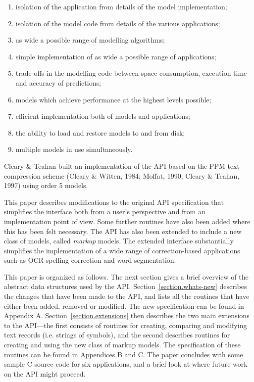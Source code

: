 \documentclass[11pt]{article}
\begin{document}
\begin{enumerate}
\item  isolation of the application from details of the model implementation;

\item  isolation of the model code from details of the various applications;

\item  as wide a possible range of modelling algorithms;

\item  simple implementation of as wide a possible range of applications;

\item  trade-offs in the modelling code between space consumption, execution
time and accuracy of predictions;

\item  models which achieve performance at the highest levels possible;

\item  efficient implementation both of models and applications;

\item  the ability to load and restore models to and from disk;

\item  multiple models in use simultaneously.
\end{enumerate}

Cleary \& Teahan built an implementation of the API based on the PPM text compression
scheme (Cleary \& Witten, 1984; Moffat, 1990; Cleary \& Teahan, 1997) using order 5 models.
 
This paper describes modifications to the original API specification that simplifies
the interface both from
a user's perspective and from an implementation point of view. Some further routines
have also been added where this has been felt necessary.
The API has also been extended to include a new class of models, called
{\em markup} models. The extended interface substantially simplifies the
implementation of a wide range of correction-based applications such as OCR
spelling correction and word segmentation.

This paper is organized as follows.
The next section gives a brief overview of the abstract data structures used by the API. 
Section~\ref{section.whats-new} describes the changes that have been made to the API,
and lists all the routines that have either been added, removed or modified.
The new specification can be found in Appendix A.
Section~\ref{section.extensions} then describes the two main extensions to the API---the first consists of
routines for creating, comparing and modifying text records (i.e. strings of
symbols), and the second describes routines for creating and using the new class
of markup models. The specification of these routines can be found
in Appendices B and C. The paper concludes with some sample
C source code for six applications, and a brief look at where future work
on the API might proceed.
\end{document}
